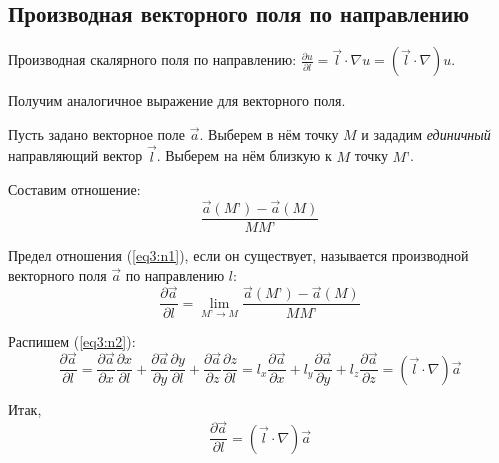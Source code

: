 \subsection{Производная векторного поля по направлению}

	Производная скалярного поля по направлению: \( \frac{\partial u}{\partial l} = \vec{l}\cdot\nabla u = (\vec{l}\cdot\nabla)u \).
	
	Получим аналогичное выражение для векторного поля.
	
	Пусть задано векторное поле \( \vec{a} \). Выберем в нём точку \( M \) и зададим \textit{единичный} направляющий вектор \( \vec{l} \). Выберем на нём близкую к \( M \) точку \( M’ \).
	
	Составим отношение:
	\begin{equation}
		\frac{\vec{a}(M’) - \vec{a}(M)}{MM’} \label{eq3:n1}
	\end{equation}
	
	\begin{definition}
	Предел отношения (\ref{eq3:n1}), если он существует, называется производной векторного поля \( \vec{a} \) по направлению \( l \):
	\begin{equation}
		\frac{\partial \vec{a}}{\partial l} = \lim_{M’ \to M} \frac{\vec{a}(M’) - \vec{a}(M)}{MM’} \label{eq3:n2}
	\end{equation}
	\end{definition}
	
	Распишем (\ref{eq3:n2}):
	\[ \frac{\partial \vec{a}}{\partial l} = \frac{\partial \vec{a}}{\partial x}\frac{\partial x}{\partial l} + \frac{\partial \vec{a}}{\partial y}\frac{\partial y}{\partial l} + \frac{\partial \vec{a}}{\partial z}\frac{\partial z}{\partial l} = l_x\frac{\partial \vec{a}}{\partial x} + l_y\frac{\partial \vec{a}}{\partial y} + l_z\frac{\partial \vec{a}}{\partial z} = (\vec{l}\cdot\nabla)\vec{a} \]
	
	Итак,
	\begin{equation}
		\frac{\partial \vec{a}}{\partial l} = (\vec{l}\cdot\nabla)\vec{a} \label{eq3:n3}
	\end{equation}
	
	\begin{comment}
	Записывать \( \vec{l}\cdot\nabla\vec{a} \) -- нельзя, так как операция \( \nabla\vec{a} = \gradient{\vec{a}} \) -- градиент векторного поля -- не определена в векторном анализе, а определена только операция \( \nabla u = \gradient{u} = \{ \frac{\partial u}{\partial x}, \frac{\partial u}{\partial y}, \frac{\partial u}{\partial z} \} \).
	\end{comment}
	
